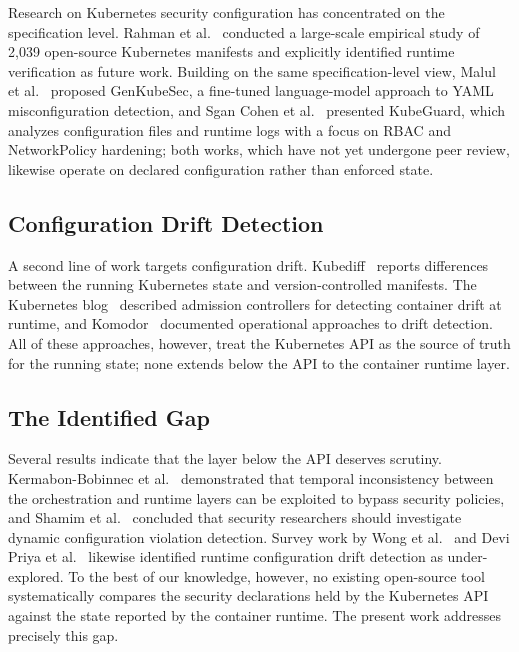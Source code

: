 \documentclass[sigconf]{acmart}
\begin{document}
Research on Kubernetes security configuration has concentrated on the specification level. Rahman et al.~\cite{rahman2023} conducted a large-scale empirical study of 2,039 open-source Kubernetes manifests and explicitly identified runtime verification as future work. Building on the same specification-level view, Malul et al.~\cite{malul2024} proposed GenKubeSec, a fine-tuned language-model approach to YAML misconfiguration detection, and Sgan Cohen et al.~\cite{sgancohen2025} presented KubeGuard, which analyzes configuration files and runtime logs with a focus on RBAC and NetworkPolicy hardening; both works, which have not yet undergone peer review, likewise operate on declared configuration rather than enforced state.

\subsection{Configuration Drift Detection}

A second line of work targets configuration drift. Kubediff~\cite{kubediff2020} reports differences between the running Kubernetes state and version-controlled manifests. The Kubernetes blog~\cite{k8sdrift2021} described admission controllers for detecting container drift at runtime, and Komodor~\cite{komodor2023} documented operational approaches to drift detection. All of these approaches, however, treat the Kubernetes API as the source of truth for the running state; none extends below the API to the container runtime layer.

\subsection{The Identified Gap}

Several results indicate that the layer below the API deserves scrutiny. Kermabon-Bobinnec et al.~\cite{prospec2022} demonstrated that temporal inconsistency between the orchestration and runtime layers can be exploited to bypass security policies, and Shamim et al.~\cite{shamim2025} concluded that security researchers should investigate dynamic configuration violation detection. Survey work by Wong et al.~\cite{wong2023} and Devi Priya et al.~\cite{devipriya2023} likewise identified runtime configuration drift detection as under-explored. To the best of our knowledge, however, no existing open-source tool systematically compares the security declarations held by the Kubernetes API against the state reported by the container runtime. The present work addresses precisely this gap.
\end{document}

